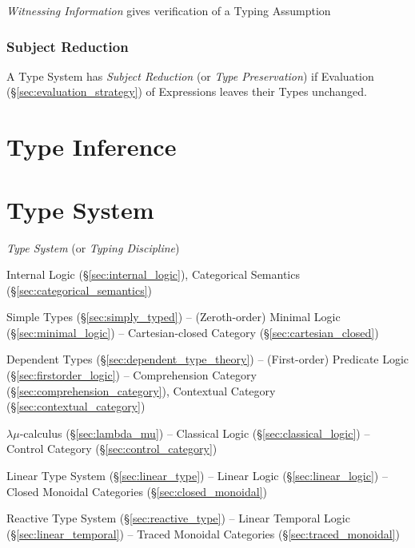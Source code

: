 \emph{Witnessing Information} gives verification of a Typing
Assumption



\subsubsection{Subject Reduction}\label{sec:subject_reduction}

A Type System has \emph{Subject Reduction} (or \emph{Type
  Preservation}) if Evaluation (\S\ref{sec:evaluation_strategy}) of
Expressions leaves their Types unchanged.



\section{Type Inference}\label{sec:type_inference}

\section{Type System}\label{sec:type_system}

\emph{Type System} (or \emph{Typing Discipline})

Internal Logic (\S\ref{sec:internal_logic}), Categorical Semantics
(\S\ref{sec:categorical_semantics})

Simple Types (\S\ref{sec:simply_typed}) -- (Zeroth-order) Minimal
Logic (\S\ref{sec:minimal_logic}) -- Cartesian-closed Category
(\S\ref{sec:cartesian_closed})

Dependent Types (\S\ref{sec:dependent_type_theory}) -- (First-order)
Predicate Logic (\S\ref{sec:firstorder_logic}) -- Comprehension
Category (\S\ref{sec:comprehension_category}), Contextual Category
(\S\ref{sec:contextual_category})

$\lambda\mu$-calculus (\S\ref{sec:lambda_mu}) -- Classical Logic
(\S\ref{sec:classical_logic}) -- Control Category
(\S\ref{sec:control_category})

Linear Type System (\S\ref{sec:linear_type}) -- Linear Logic
(\S\ref{sec:linear_logic}) -- Closed Monoidal Categories
(\S\ref{sec:closed_monoidal})

Reactive Type System (\S\ref{sec:reactive_type}) -- Linear Temporal
Logic (\S\ref{sec:linear_temporal}) -- Traced Monoidal Categories
(\S\ref{sec:traced_monoidal})

